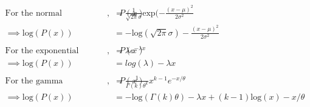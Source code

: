\documentclass[11pt]{report}
\begin{document}
\begin{comment}
\subsection*{Normal Distribution}
$$P(x) = \frac{1}{\sqrt{2\pi} \sigma}\textrm{exp}(-\frac{(x - \mu)^2}{2\sigma^2})$$
$\textrm{log}(P(x)) = -\textrm{log}(\sqrt{2\pi} \sigma) -\frac{(x - \mu)^2}{2\sigma^2}$ 	
\subsection*{Exponential Distribution}
$$P(x) = \lambda e^{-\lambda x} $$
$\textrm{log}(P(x)) = log(\lambda) - \lambda x$
\subsection*{Gamma Distribution}
$$P(x) = \frac{1}{\Gamma(k) \theta^k} x^{k-1}e^{-x/\theta}$$
$\textrm{log}(P(x)) = -\textrm{log}(\Gamma(k)\theta) - \lambda x + (k-1)\textrm{log}(x) -x/\theta$
\end{comment}

\begin{align*}
	\text{For the normal distribution}, \quad P(x) &= \frac{1}{\sqrt{2\pi} \sigma}\textrm{exp}(-\frac{(x - \mu)^2}{2\sigma^2}\\
	\implies \text{log}(P(x)) &= -\textrm{log}(\sqrt{2\pi} \sigma) -\frac{(x - \mu)^2}{2\sigma^2}\\ \\ 
	\text{For the exponential distribution}, \quad P(x) &= \lambda e^{-\lambda x}\\
	\implies \textrm{log}(P(x)) &= log(\lambda) - \lambda x\\ \\ 
	\text{For the gamma distribution}, \quad P(x) &= \frac{1}{\Gamma(k) \theta^k} x^{k-1}e^{-x/\theta}\\
	\implies \textrm{log}(P(x)) &= -\textrm{log}(\Gamma(k)\theta) - \lambda x + (k-1)\textrm{log}(x) -x/\theta\\
\end{align*}



\newpage
\end{document}
